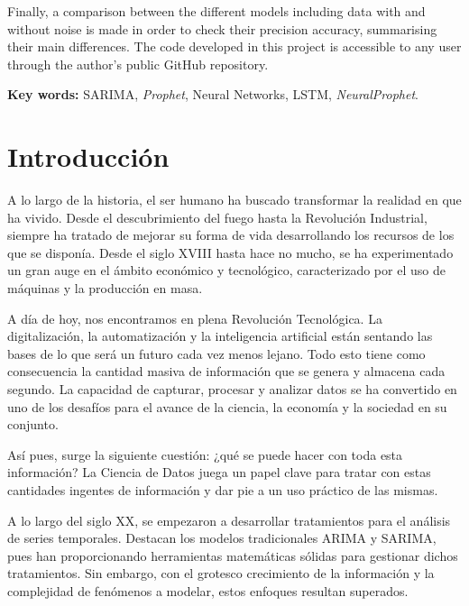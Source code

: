 \documentclass[12pt,twoside]{article}
\begin{document}
Finally, a comparison between the different models including data with and without noise is made in order to check their precision accuracy, summarising their main differences. The code developed in this project is accessible to any user through the author’s public GitHub repository.

\textbf{Key words:} SARIMA, \textit{Prophet}, Neural Networks, LSTM, \textit{NeuralProphet}.


\newpage

\tableofcontents

\newpage

\section{Introducción}\label{sec:1}

A lo largo de la historia, el ser humano ha buscado transformar la realidad en que ha vivido. Desde el descubrimiento del fuego hasta la Revolución Industrial, siempre ha tratado de mejorar su forma de vida desarrollando los recursos de los que se disponía. Desde el siglo XVIII hasta hace no mucho, se ha experimentado un gran auge en el ámbito económico y tecnológico, caracterizado por el uso de máquinas y la producción en masa. 

A día de hoy, nos encontramos en plena Revolución Tecnológica. La digitalización, la automatización y la inteligencia artificial están sentando las bases de lo que será un futuro cada vez menos lejano. Todo esto tiene como consecuencia la cantidad masiva de información que se genera y almacena cada segundo. La capacidad de capturar, procesar y analizar datos se ha convertido en uno de los desafíos para el avance de la ciencia, la economía y la sociedad en su conjunto.

Así pues, surge la siguiente cuestión: ¿qué se puede hacer con toda esta información? La Ciencia de Datos juega un papel clave para tratar con estas cantidades ingentes de información y dar pie a un uso práctico de las mismas.

A lo largo del siglo XX, se empezaron a  desarrollar tratamientos para el análisis de series temporales. Destacan los modelos tradicionales ARIMA y SARIMA, pues han proporcionando herramientas matemáticas sólidas para gestionar dichos tratamientos. Sin embargo, con el grotesco crecimiento de la información y la complejidad de fenómenos a modelar, estos enfoques resultan superados.
\end{document}
